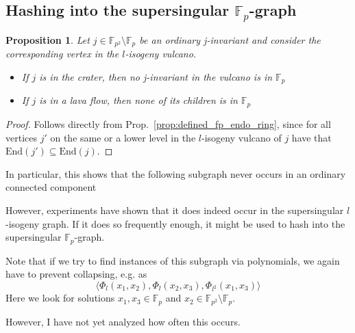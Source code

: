 \documentclass{scrartcl}
\newcommand{\F}{\mathbb{F}}
\newcommand{\End}{\mathrm{End}}
\newtheorem{prop}{Proposition}[section]
\theoremstyle{definition}
\begin{document}
\subsection{Hashing into the supersingular $\F_p$-graph}
\begin{prop}
    Let $j \in \F_{p^2} \setminus \F_p$ be an ordinary j-invariant and consider the corresponding vertex in the $l$-isogeny vulcano.
    \begin{itemize}
        \item If $j$ is in the crater, then no j-invariant in the vulcano is in $\F_p$
        \item If $j$ is in a lava flow, then none of its children is in $\F_p$
    \end{itemize}
\end{prop}
\begin{proof}
    Follows directly from Prop.~\ref{prop:defined_fp_endo_ring}, since for all vertices $j'$ on the same or a lower level in the $l$-isogeny vulcano of $j$ have that $\End(j') \subseteq \End(j)$.
\end{proof}
In particular, this shows that the following subgraph never occurs in an ordinary connected component
\begin{center}
\end{center}
However, experiments have shown that it does indeed occur in the supersingular $l$-isogeny graph.
If it does so frequently enough, it might be used to hash into the supersingular $\F_p$-graph.

Note that if we try to find instances of this subgraph via polynomials, we again have to prevent collapsing, e.g. as
\begin{equation*}
    \langle \Phi_l(x_1, x_2), \Phi_l(x_2, x_3), \Phi_{l^2}(x_1, x_3) \rangle
\end{equation*}
Here we look for solutions $x_1, x_3 \in \F_p$ and $x_2 \in \F_{p^2} \setminus \F_p$.

However, I have not yet analyzed how often this occurs.
\end{document}
